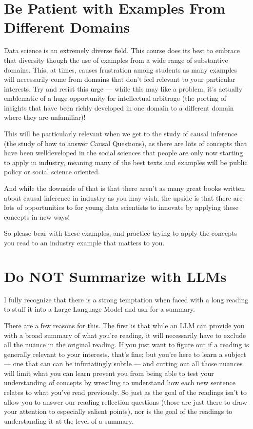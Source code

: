 \documentclass[letterpaper,10pt,english]{jupyterBook}
\begin{document}
\section{Be Patient with Examples From Different Domains}
\label{\detokenize{40_in_practice/00_how_to_read_this_book:be-patient-with-examples-from-different-domains}}
\sphinxAtStartPar
Data science is an extremely diverse field. This course does its best to embrace that diversity though the use of examples from a wide range of substantive domains. This, at times, causes frustration among students as many examples will necessarily come from domains that don’t feel relevant to your particular interests. Try and resist this urge — while this may  like a problem, it’s actually emblematic of a huge opportunity for intellectual arbitrage (the porting of insights that have been richly developed in one domain to a different domain where they are unfamiliar)!

\sphinxAtStartPar
This will be particularly relevant when we get to the study of causal inference (the study of how to answer Causal Questions), as there are lots of concepts that have been well\sphinxhyphen{}developed in the social sciences that people are only now starting to apply in industry, meaning many of the best texts and examples will be public policy or social science oriented.

\sphinxAtStartPar
And while the downside of that is that there aren’t as many great books written about causal inference in industry as you may wish, the upside is that there are lots of opportunities to for young data scientists to innovate by applying these concepts in new ways!

\sphinxAtStartPar
So please bear with these examples, and practice trying to apply the concepts you read to an industry example that matters to you.


\section{Do NOT Summarize with LLMs}
\label{\detokenize{40_in_practice/00_how_to_read_this_book:do-not-summarize-with-llms}}
\sphinxAtStartPar
I fully recognize that there is a strong temptation when faced with a long reading to stuff it into a Large Language Model and ask for a summary. 

\sphinxAtStartPar
There are a few reasons for this. The first is that while an LLM can provide you with a broad summary of what you’re reading, it will necessarily have to exclude all the nuance in the original reading. If you just want to figure out if a reading is generally relevant to your interests, that’s fine; but you’re here to learn a subject — one that can can be infuriatingly subtle — and cutting out all those nuances will limit what you can learn  prevent you from being able to test your understanding of concepts by wrestling to understand how each new sentence relates to what you’ve read previously. So just as the goal of the readings isn’t to allow you to answer our reading reflection questions (those are just there to draw your attention to especially salient points), nor is the goal of the readings to understanding it at the level of a summary.
\end{document}
